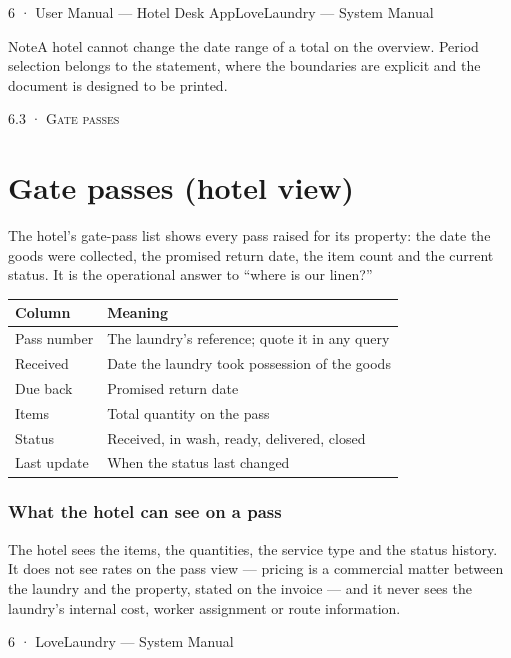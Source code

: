 \documentclass[11pt,a4paper,oneside]{book}
\begin{document}
6 · User Manual — Hotel Desk AppLoveLaundry — System Manual

\begin{notebox}NoteA hotel cannot change the date range of a total on the overview. Period selection belongs to the statement, where the boundaries are explicit and the document is designed to be printed.\end{notebox}
\textsc{\small\color{crimson}6.3 · Gate passes}\par\medskip
\section*{Gate passes (hotel view)}
The hotel's gate-pass list shows every pass raised for its property: the date the goods were collected, the promised return date, the item count and the current status. It is the operational answer to “where is our linen?”

\begin{center}\small
\begin{tabularx}{\linewidth}{|X|X|}
\hline
\rowcolor{lightgrey}
\textbf{Column} & \textbf{Meaning} \\ \hline
Pass number & The laundry's reference; quote it in any query \\ \hline
Received & Date the laundry took possession of the goods \\ \hline
Due back & Promised return date \\ \hline
Items & Total quantity on the pass \\ \hline
Status & Received, in wash, ready, delivered, closed \\ \hline
Last update & When the status last changed \\ \hline
\end{tabularx}
\end{center}
\subsubsection*{What the hotel can see on a pass}
The hotel sees the items, the quantities, the service type and the status history. It does not see rates on the pass view — pricing is a commercial matter between the laundry and the property, stated on the invoice — and it never sees the laundry's internal cost, worker assignment or route information.

6 · LoveLaundry — System Manual
\end{document}
